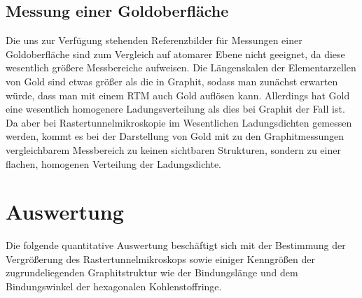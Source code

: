 \documentclass[10pt, a4paper]{article}
\begin{document}
\subsection{Messung einer Goldoberfläche}
Die uns zur Verfügung stehenden Referenzbilder für Messungen einer Goldoberfläche sind zum Vergleich auf atomarer Ebene nicht geeignet, da diese wesentlich größere Messbereiche aufweisen.
Die Längenskalen der Elementarzellen von Gold sind etwas größer als die in Graphit, sodass man zunächst erwarten würde, dass man mit einem RTM auch Gold auflösen kann.
Allerdings hat Gold eine wesentlich homogenere Ladungsverteilung als dies bei Graphit der Fall ist.
Da aber bei Rastertunnelmikroskopie im Wesentlichen Ladungsdichten gemessen werden, kommt es bei der Darstellung von Gold mit zu den Graphitmessungen vergleichbarem Messbereich zu keinen sichtbaren Strukturen, sondern zu einer flachen, homogenen Verteilung der Ladungsdichte.

\section{Auswertung}
Die folgende quantitative Auswertung beschäftigt sich mit der Bestimmung der Vergrößerung des Rastertunnelmikroskops sowie einiger Kenngrößen der zugrundeliegenden Graphitstruktur wie der Bindungslänge und dem Bindungswinkel der hexagonalen Kohlenstoffringe.
\end{document}
